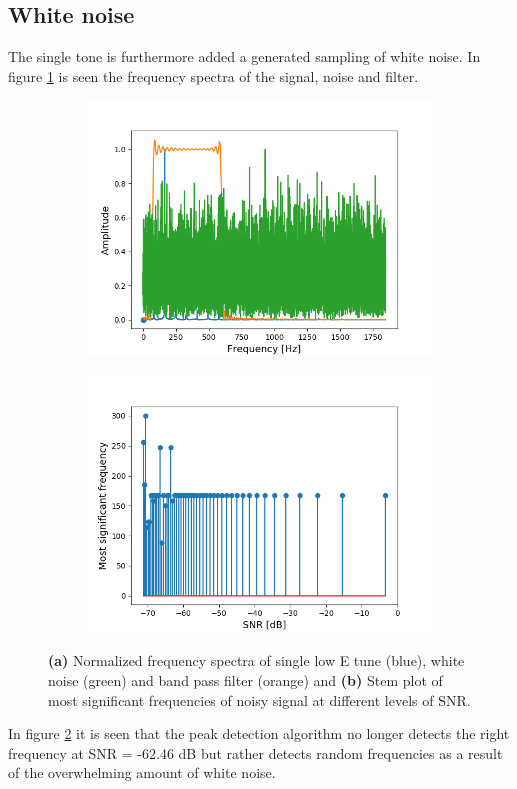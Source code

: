 \subsection{White noise}
The single tone is furthermore added a generated sampling of white noise. In figure \ref{fig:white_spectrum} is seen the frequency spectra of the signal, noise and filter.
\begin{figure}[H]
\begin{subfigure}{0.49\textwidth}
\centering
\includegraphics[width=\textwidth]{figures/SNR/white_spectrum.png}
\caption{}
\label{fig:white_spectrum}
\end{subfigure}
\begin{subfigure}{0.49\textwidth}
\centering
\includegraphics[width=\textwidth]{figures/SNR/white_stem.png}
\caption{}
\label{fig:white_stem}
\end{subfigure}
\caption{\textbf{(a)} Normalized frequency spectra of single low E tune (blue), white noise (green) and band pass filter (orange) and \textbf{(b)} Stem plot of most significant frequencies of noisy signal at different levels of SNR.}
\label{fig:white_noise}
\end{figure}
In figure \ref{fig:white_stem} it is seen that the peak detection algorithm no longer detects the right frequency at SNR = -62.46 dB but rather detects random frequencies as a result of the overwhelming amount of white noise.
